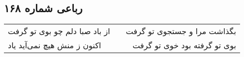 \begin{center}
\section*{رباعی شماره ۱۶۸}
\label{sec:sh168}
\begin{longtable}{l p{0.5cm} r}
از باد صبا دلم چو بوی تو گرفت
&&
بگذاشت مرا و جستجوی تو گرفت
\\
اکنون ز منش هیچ نمی‌آید یاد
&&
بوی تو گرفته بود خوی تو گرفت
\\
\end{longtable}
\end{center}
